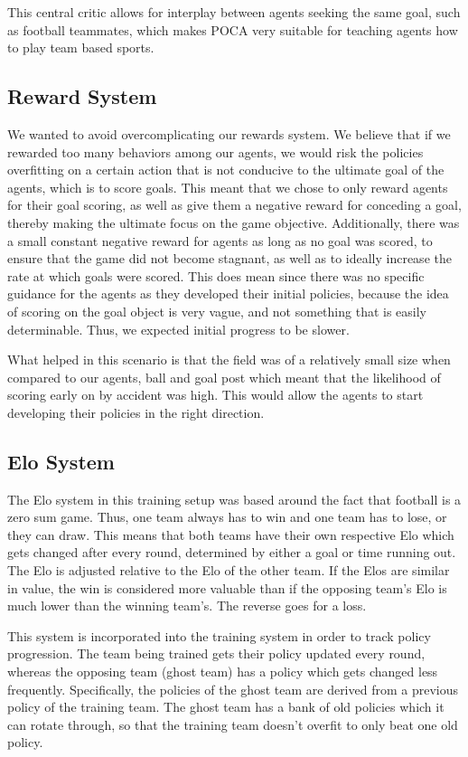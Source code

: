 \documentclass{LSkill}
\begin{document}
This central critic allows for interplay between agents seeking the same goal, such as football teammates, which makes POCA very suitable for teaching agents how to play team based sports. 
\subsection{Reward System}
We wanted to avoid overcomplicating our rewards system. We believe that if we rewarded too many behaviors among our agents, we would risk the policies overfitting on a certain action that is not conducive to the ultimate goal of the agents, which is to score goals.
This meant that we chose to only reward agents for their goal scoring, as well as give them a negative reward for conceding a goal, thereby making the ultimate focus on the game objective. Additionally, there was a small constant negative reward for agents as long as no goal was scored, to ensure that the game did not become stagnant, as well as to ideally increase the rate at which goals were scored. This does mean since there was no specific guidance for the agents as they developed their initial policies, because the idea of scoring on the goal object is very vague, and not something that is easily determinable. Thus, we expected initial progress to be slower. 

What helped in this scenario is that the field was of a relatively small size when compared to our agents, ball and goal post which meant that the likelihood of scoring early on by accident was high. This would allow the agents to start developing their policies in the right direction. 
\subsection{Elo System}
The Elo system in this training setup was based around the fact that football is a zero sum game. Thus, one team always has to win and one team has to lose, or they can draw. This means that both teams have their own respective Elo which gets changed after every round, determined by either a goal or time running out. The Elo is adjusted relative to the Elo of the other team. If the Elos are similar in value, the win is considered more valuable than if the opposing team’s Elo is much lower than the winning team’s. The reverse goes for a loss. 

This system is incorporated into the training system in order to track policy progression. The team being trained gets their policy updated every round, whereas the opposing team (ghost team) has a policy which gets changed less frequently. Specifically, the policies of the ghost team are derived from a previous policy of the training team. The ghost team has a bank of old policies which it can rotate through, so that the training team doesn’t overfit to only beat one old policy. 
\end{document}
